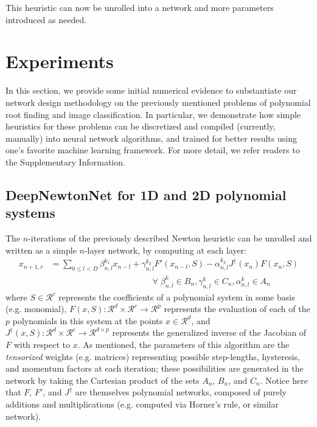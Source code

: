 \documentclass{article}
\begin{document}
This heuristic can now be unrolled into a network and more parameters introduced as needed.











\section{Experiments}
In this section, we provide some initial numerical evidence to substantiate our network design methodology on the previously mentioned problems of polynomial root finding and image classification. In particular, we demonstrate how simple heuristics for these problems can be discretized and compiled (currently, manually) into neural network algorithms, and trained for better results using one's favorite machine learning framework. For more detail, we refer readers to the Supplementary Information.

\subsection*{DeepNewtonNet for 1D and 2D polynomial systems}
The $n$-iterations of the previously described Newton heuristic can be unrolled and written as a simple $n$-layer network, by computing at each layer:
\begin{align}
    x_{n+1,r} &= \sum_{0 \leq l < D} \beta_{n,l}^{k_1} x_{n-l} + \gamma_{n,l}^{k_2}F'(x_{n-l},S) - \alpha_{n,l}^{k_3} J^{\dagger}(x_n)F(x_n,S) \nonumber \\
    & \qquad\qquad\qquad\qquad\qquad\qquad \forall \; \beta_{n,l}^k \in B_n, \gamma_{n,l}^k \in C_n, \alpha_{n,l}^k \in A_n \nonumber
\end{align}
where $S \in \mathcal{R}^c$ represents the coefficients of a polynomial system in some basis (e.g. monomial), \mbox{$F(x,S):\mathcal{R}^d \times \mathcal{R}^c \rightarrow \mathcal{R}^p$} represents the evaluation of each of the $p$ polynomials in this system at the points $x \in \mathcal{R}^d$, and $J^{\dagger}(x,S):\mathcal{R}^d \times \mathcal{R}^c \rightarrow \mathcal{R}^{d \times p}$ represents the generalized inverse of the Jacobian of $F$ with respect to $x$. As mentioned, the parameters of this algorithm are the \textit{tensorized} weights (e.g. matrices) representing possible step-lengths, hysteresis, and momentum factors at each iteration; these possibilities are generated in the network by taking the Cartesian product of the sets $A_n$, $B_n$, and $C_n$. Notice here that $F$, $F'$, and $J^{\dagger}$ are themselves polynomial networks, composed of purely additions and multiplications (e.g. computed via Horner's rule, or similar network).
\end{document}
